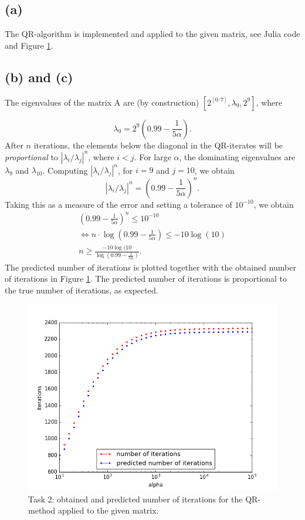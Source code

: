 \subsection*{(a)}
The QR-algorithm is implemented and applied to the given matrix, see Julia code and Figure  \ref{task2}.

\subsection*{(b) and (c)}
The eigenvalues of the matrix A are (by construction) $[2^{[0:7]}, \lambda_9, 2^9]$,
where

\begin{equation}
\lambda_{9} = 2^9\left(0.99-\frac{1}{5\alpha}\right).
\end{equation}
After $n$ iterations, the elements below the diagonal in the QR-iterates will be \emph{proportional} to $|\lambda_i/\lambda_j|^n$, where $i<j$. For large $\alpha$, the dominating eigenvalues are $\lambda_9$ and $\lambda_{10}$. Computing $|\lambda_i/\lambda_j|^n$, for $i = 9$ and $j = 10$, we obtain
\begin{equation}
|\lambda_i/\lambda_j|^n = \left(0.99-\frac{1}{5\alpha}\right)^n.
\end{equation}
Taking this as a measure of the error and setting a tolerance of $10^{-10}$, we obtain
\begin{equation}
\begin{aligned}
\left(0.99-\frac{1}{5\alpha}\right)^n\leq 10^{-10}\\
\Leftrightarrow
n\cdot\log(0.99-\frac{1}{5\alpha})\leq -10 \log(10)\\
n\geq \frac{-10\log(10}{\log(0.99-\frac{1}{5\alpha})}.
\end{aligned}
\end{equation}
The  predicted number of iterations is plotted together with the obtained number of iterations in Figure \ref{task2}. The predicted number of iterations is proportional to the true number of iterations, as expected.

\begin{figure}[h!]
\centering
\includegraphics[scale=0.6]{alpha.png}
\caption{Task 2: obtained and predicted number of iterations for the QR-method applied to the given matrix.}
\label{task2}
\end{figure}
